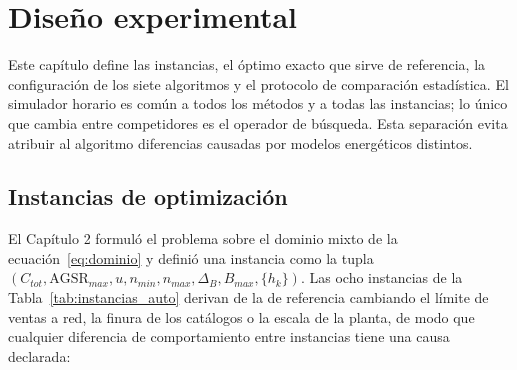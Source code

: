 \chapter{Diseño experimental}

Este capítulo define las instancias, el óptimo exacto que sirve de referencia, la configuración de los siete algoritmos y el protocolo de comparación estadística. El simulador horario es común a todos los métodos y a todas las instancias; lo único que cambia entre competidores es el operador de búsqueda. Esta separación evita atribuir al algoritmo diferencias causadas por modelos energéticos distintos.

\section{Instancias de optimización}
\label{sec:instancias_experimento}

El Capítulo 2 formuló el problema sobre el dominio mixto de la ecuación~\eqref{eq:dominio} y definió una instancia como la tupla $(C_{tot},\mathrm{AGSR}_{max},u,n_{min},n_{max},\Delta_B,B_{max},\{h_k\})$. Las ocho instancias de la Tabla~\ref{tab:instancias_auto} derivan de la de referencia cambiando el límite de ventas a red, la finura de los catálogos o la escala de la planta, de modo que cualquier diferencia de comportamiento entre instancias tiene una causa declarada:

